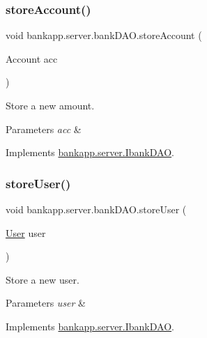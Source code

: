 \subsubsection{\texorpdfstring{store\+Account()}{storeAccount()}}
{\footnotesize\ttfamily void bankapp.\+server.\+bank\+D\+A\+O.\+store\+Account (\begin{DoxyParamCaption}\item[{Account}]{acc }\end{DoxyParamCaption})}



Store a new amount. 


\begin{DoxyParams}{Parameters}
{\em acc} & \\
\hline
\end{DoxyParams}


Implements \hyperlink{interfacebankapp_1_1server_1_1IbankDAO_a6631fb11c78a48b05a743e4f7f2757ef}{bankapp.\+server.\+Ibank\+D\+AO}.

\mbox{\label{classbankapp_1_1server_1_1bankDAO_a2026e5f30e2342995dddfc654a37d640}} 
\subsubsection{\texorpdfstring{store\+User()}{storeUser()}}
{\footnotesize\ttfamily void bankapp.\+server.\+bank\+D\+A\+O.\+store\+User (\begin{DoxyParamCaption}\item[{\hyperlink{classbankapp_1_1server_1_1User}{User}}]{user }\end{DoxyParamCaption})}



Store a new user. 


\begin{DoxyParams}{Parameters}
{\em user} & \\
\hline
\end{DoxyParams}


Implements \hyperlink{interfacebankapp_1_1server_1_1IbankDAO_a9cb41e7c04366f4ec9cfcb74d43ee37f}{bankapp.\+server.\+Ibank\+D\+AO}.

\mbox{\label{classbankapp_1_1server_1_1bankDAO_a22f03ae02432bc82af70d212a7a8cdba}} 
